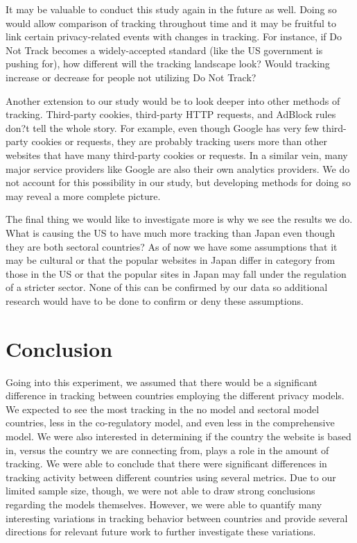 \documentclass[journal]{IEEEtran}
\begin{document}
It may be valuable to conduct this study again in the future as well. Doing so would allow comparison of tracking throughout time and it may be fruitful to link certain privacy-related events with changes in tracking. For instance, if Do Not Track becomes a widely-accepted standard (like the US government is pushing for), how different will the tracking landscape look? Would tracking increase or decrease for people not utilizing Do Not Track?

Another extension to our study would be to look deeper into other methods of tracking. Third-party cookies, third-party HTTP requests, and AdBlock rules don?t tell the whole story. For example, even though Google has very few third-party cookies or requests, they are probably tracking users more than other websites that have many third-party cookies or requests. In a similar vein, many major service providers like Google are also their own analytics providers. We do not account for this possibility in our study, but developing methods for doing so may reveal a more complete picture.

The final thing we would like to investigate more is why we see the results we do. What is causing the US to have much more tracking than Japan even though they are both sectoral countries? As of now we have some assumptions that it may be cultural or that the popular websites in Japan differ in category from those in the US or that the popular sites in Japan may fall under the regulation of a stricter sector. None of this can be confirmed by our data so additional research would have to be done to confirm or deny these assumptions.

\section{Conclusion}
Going into this experiment, we assumed that there would be a significant difference in tracking between countries employing the different privacy models. We expected to see the most tracking in the no model and sectoral model countries, less in the co-regulatory model, and even less in the comprehensive model. We were also interested in determining if the country the website is based in, versus the country we are connecting from, plays a role in the amount of tracking. We were able to conclude that there were significant differences in tracking activity between different countries using several metrics. Due to our limited sample size, though, we were not able to draw strong conclusions regarding the models themselves. However, we were able to quantify many interesting variations in tracking behavior between countries and provide several directions for relevant future work to further investigate these variations.
\end{document}

